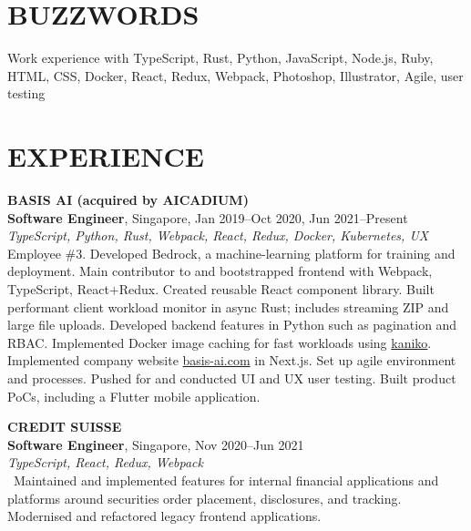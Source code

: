 \documentclass[line, margin]{res}
\makeatletter
\newcommand{\at}[0]{@}
\makeatother
\begin{document}
\address{
    \href{mailto:ng.guoyou+cv\at gmail.com}{ng.guoyou\at gmail.com}
    \href{https://github.com/gyng}{github.com/gyng}
}

\begin{resume}
    \section{BUZZWORDS}
        Work experience with TypeScript, Rust, Python, JavaScript, Node.js, Ruby, HTML, CSS, Docker, React, Redux, Webpack, Photoshop, Illustrator, Agile, user testing

    \section{EXPERIENCE}
        \textbf{BASIS AI (acquired by AICADIUM)} \\
        \textbf{Software Engineer}, Singapore, Jan 2019--Oct 2020, Jun 2021--Present \\
        \textit{TypeScript, Python, Rust, Webpack, React, Redux, Docker, Kubernetes, UX} \\
        Employee \#3. Developed Bedrock, a machine-learning platform for training and deployment.
        Main contributor to and bootstrapped frontend with Webpack, TypeScript, React$+$Redux. Created reusable React component library.
        Built performant client workload monitor in async Rust; includes streaming ZIP and large file uploads.
        Developed backend features in Python such as pagination and RBAC.
        Implemented Docker image caching for fast workloads using \href{https://github.com/GoogleContainerTools/kaniko}{kaniko}.
        Implemented company website \href{https://basis-ai.com/}{basis-ai.com} in Next.js.
        Set up agile environment and processes. Pushed for and conducted UI and UX user testing. Built product PoCs, including a Flutter mobile application.
    
        \textbf{CREDIT SUISSE} \\
        \textbf{Software Engineer}, Singapore, Nov 2020--Jun 2021 \\
        \textit{TypeScript, React, Redux, Webpack} \\\
        Maintained and implemented features for internal financial applications and platforms around securities order placement, disclosures, and tracking. Modernised and refactored legacy frontend applications.


\end{resume}
\end{document}
